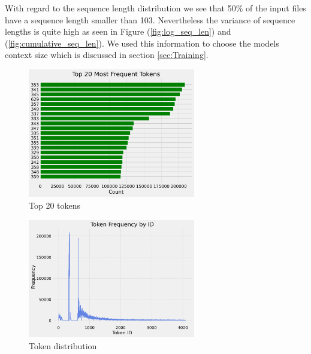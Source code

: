 \documentclass[a4paper,12pt]{extarticle}
\begin{document}
With regard to the sequence length distribution we see that 50\% of the input files have a sequence length smaller than 103.
Nevertheless the variance of sequence lengths is quite high as seen in Figure (\ref{fig:log_seq_len}) and (\ref{fig:cumulative_seq_len}). We used this information to choose the models context size which is discussed in section \ref{sec:Training}. \newline
\begin{figure}[H]
    \centering
    \includegraphics[width=0.65\textwidth]{visualization_4096_REMI_train_manual_tokens_True_random_padding_True_top_frequent_tokens.png}
    \caption{Top 20 tokens}
    \label{fig:top_20_tokens}
\end{figure}

\begin{figure}[H]
    \centering
    \includegraphics[width=0.65\textwidth]{visualization_4096_REMI_train_manual_tokens_True_random_padding_True_token_frequency_by_id.png}
    \caption{Token distribution}
    \label{fig:token_distribution}
\end{figure}
\end{document}
